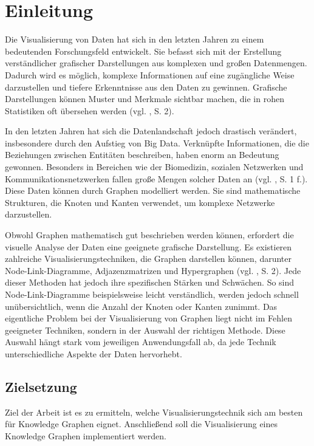 
\chapter{Einleitung}

Die Visualisierung von Daten hat sich in den letzten Jahren zu einem bedeutenden Forschungsfeld entwickelt. Sie befasst sich mit der Erstellung verständlicher grafischer Darstellungen aus komplexen und großen Datenmengen. Dadurch wird es möglich, komplexe Informationen auf eine zugängliche Weise darzustellen und tiefere Erkenntnisse aus den Daten zu gewinnen. Grafische Darstellungen können Muster und Merkmale sichtbar machen, die in rohen Statistiken oft übersehen werden (vgl. \cite{unwin:WhyDataVisualization}, S. 2).

In den letzten Jahren hat sich die Datenlandschaft jedoch drastisch verändert, insbesondere durch den Aufstieg von Big Data. Verknüpfte Informationen, die die Beziehungen zwischen Entitäten beschreiben, haben enorm an Bedeutung gewonnen. Besonders in Bereichen wie der Biomedizin, sozialen Netzwerken und Kommunikationsnetzwerken fallen große Mengen solcher Daten an (vgl. \cite{chen:SurveyGraphVisualization}, S. 1 f.). Diese Daten können durch Graphen modelliert werden. Sie sind mathematische Strukturen, die Knoten und Kanten verwendet, um komplexe Netzwerke darzustellen.

Obwohl Graphen mathematisch gut beschrieben werden können, erfordert die visuelle Analyse der Daten eine geeignete grafische Darstellung. Es existieren zahlreiche Visualisierungstechniken, die Graphen darstellen können, darunter Node-Link-Diagramme, Adjazenzmatrizen und Hypergraphen (vgl. \cite{chen:SurveyGraphVisualization}, S. 2). Jede dieser Methoden hat jedoch ihre spezifischen Stärken und Schwächen. So sind Node-Link-Diagramme beispielsweise leicht verständlich, werden jedoch schnell unübersichtlich, wenn die Anzahl der Knoten oder Kanten zunimmt. Das eigentliche Problem bei der Visualisierung von Graphen liegt nicht im Fehlen geeigneter Techniken, sondern in der Auswahl der richtigen Methode. Diese Auswahl hängt stark vom jeweiligen Anwendungsfall ab, da jede Technik unterschiedliche Aspekte der Daten hervorhebt.

\section{Zielsetzung}

Ziel der Arbeit ist es zu ermitteln, welche Visualisierungstechnik sich am besten für Knowledge Graphen eignet. Anschließend soll die Visualisierung eines Knowledge Graphen implementiert werden.

